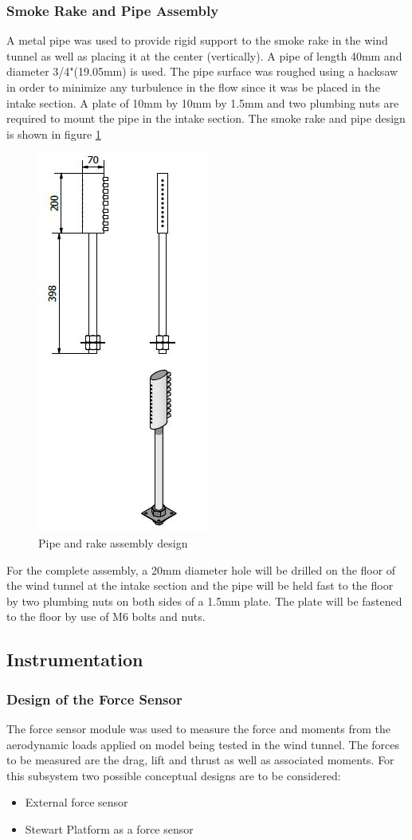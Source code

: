 \subsubsection*{Smoke Rake and Pipe Assembly}
A metal pipe was used to provide rigid support to the smoke rake in the wind tunnel as well as placing it at the center
(vertically). A pipe of length 40mm and diameter 3/4"(19.05mm) is used. The pipe surface was roughed using a hacksaw in
order to minimize any turbulence in the flow since it was be placed in the intake section. A plate of 10mm by 10mm by 1.5mm
and two plumbing nuts are required to mount the pipe in the intake section. The smoke rake and pipe design is shown
in figure \ref{pipe and rake}
\begin{center}
	\begin{figure}[H]
		\centering
		\includegraphics[width=0.25\linewidth]{Figures/pipe and rake.JPG}
		\caption[Pipe and rake]{Pipe and rake assembly design}
		\label{pipe and rake}
	\end{figure}
\end{center}
For the complete assembly, a 20mm diameter hole will be drilled on the floor of the wind tunnel at the intake section
and the pipe will be held fast to the floor by two plumbing nuts on both sides of a 1.5mm plate. The plate will be fastened to
the floor by use of M6 bolts and nuts.
\subsection{Instrumentation}
\subsubsection{Design of the Force Sensor}
The force sensor module was used to measure the force and moments from the aerodynamic loads applied on model being tested in the wind tunnel. The forces to be measured are the drag, lift and thrust as well as associated moments. For this subsystem two possible conceptual designs are to be considered:
\begin{itemize}
	\item External force sensor
	\item Stewart Platform as a force sensor
\end{itemize}
